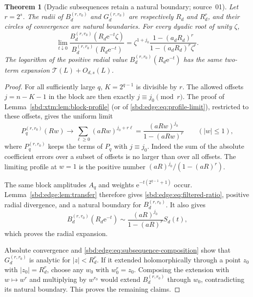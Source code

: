 \documentclass[11pt,a4paper]{article}
\newtheorem{theorem}{Theorem}[section]
\theoremstyle{definition}
\newcommand{\e}{\mathrm e}
\begin{document}
\begin{theorem}[Dyadic subsequences retain a natural boundary; source~01]
\label{sbd:edge:thm:subsequences}
Let $r=2^s$. The radii of $B_d^{(r,r_0)}$ and $G_d^{(r,r_0)}$ are
respectively $R_d$ and $R_d^r$, and their circles of convergence are
natural boundaries. For every dyadic root of unity $\zeta$,
\begin{equation}\label{sbd:edge:eq:filtered-ratio}
 \lim_{t\downarrow0}
 \frac{B_d^{(r,r_0)}(R_d\e^{-t}\zeta)}{B_d^{(r,r_0)}(R_d\e^{-t})}
 =
 \zeta^{1+j_0}
 \frac{1-(a_dR_d)^r}{1-(a_dR_d)^r\zeta^r}.
\end{equation}
The logarithm of the positive radial value $B_d^{(r,r_0)}(R_d\e^{-t})$ has
the same two-term expansion $\mathcal T(L)+O_{d,s}(L)$.
\end{theorem}
\begin{proof}
For all sufficiently large $q$, $K=2^{q-1}$ is divisible by $r$. The
allowed offsets $j=n-K-1$ in the block are then exactly $j\equiv j_0\pmod
r$. The proof of Lemma~\ref{sbd:xtm:lem:block-profile} (or of
\eqref{sbd:edge:eq:profile-limit}), restricted to these offsets, gives the
uniform limit
\begin{equation}\label{sbd:edge:eq:filtered-profile}
 P_{q}^{(r,r_0)}(Rw)\longrightarrow
 \sum_{\ell\ge0}(aRw)^{j_0+r\ell}
 =
 \frac{(aRw)^{j_0}}{1-(aRw)^r}
 \qquad(|w|\le1),
\end{equation}
where $P_q^{(r,r_0)}$ keeps the terms of $P_q$ with $j\equiv j_0$. Indeed
the sum of the absolute coefficient errors over a subset of offsets is no
larger than over all offsets. The limiting profile at $w=1$ is the positive
number $(aR)^{j_0}/(1-(aR)^r)$.

The same block amplitudes $A_q$ and weights $\e^{-t(2^{q-1}+1)}$ occur.
Lemma~\ref{sbd:edge:lem:transfer} therefore gives
\eqref{sbd:edge:eq:filtered-ratio}, positive radial divergence, and a
natural boundary for $B_d^{(r,r_0)}$. It also gives
\[
 B_d^{(r,r_0)}(R_d\e^{-t})
 \sim\frac{(aR)^{j_0}}{1-(aR)^r}S_d(t),
\]
which proves the radial expansion.

Absolute convergence and \eqref{sbd:edge:eq:subsequence-composition} show
that $G_d^{(r,r_0)}$ is analytic for $|z|<R_d^r$. If it extended
holomorphically through a point $z_0$ with $|z_0|=R_d^r$, choose any $w_0$
with $w_0^r=z_0$. Composing the extension with $w\mapsto w^r$ and
multiplying by $w^{r_0}$ would extend $B_d^{(r,r_0)}$ through $w_0$,
contradicting its natural boundary. This proves the remaining claims.
\end{proof}
\end{document}
